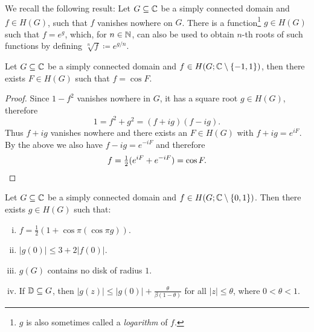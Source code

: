 We recall the following result: Let $G \subseteq \mathbb{C}$ be a simply connected domain and $f \in H(G)$, such that $f$ vanishes nowhere on $G$. There is a function\footnote{$g$ is also sometimes called a \emph{logarithm} of $f$.} $g \in H(G)$ such that $f = e^g$, which, for $n \in \mathbb{N}$, can also be used to obtain $n$-th roots of such functions by defining $\sqrt[n]{f} \coloneqq e^{g/n}$.

\begin{lemma} \label{lem:schottky-2}
    Let $G \subseteq \mathbb{C}$ be a simply connected domain and $f \in H(G; \mathbb{C} \setminus \{ -1, 1 \})$, then there exists $F \in H(G)$ such that $f = \cos F$.
\end{lemma}

\begin{proof}
    Since $1 - f^2$ vanishes nowhere in $G$, it has a square root $g \in H(G)$, therefore
    \begin{equation*}
        1 = f^2 + g^2 = (f + ig)(f - ig).
    \end{equation*}
    Thus $f + ig$ vanishes nowhere and there exists an $F \in H(G)$ with $f + ig = e^{iF}$. By the above we also have $f - ig = e^{-iF}$ and therefore
    \begin{equation*}
        f = {\textstyle \frac{1}{2}} (e^{iF} + e^{-iF}) = \cos F. \qedhere
    \end{equation*}
\end{proof}

\begin{lemma} \label{lem:schottky-3}
    Let $G \subseteq \mathbb{C}$ be a simply connected domain and $f \in H(G; \mathbb{C} \setminus \{ 0, 1 \})$. Then there exists $g \in H(G)$ such that:
    \begin{enumerate}[i.]
        \item $f = \frac{1}{2} ( 1 + \cos \pi (\cos \pi g))$.
        \item $\vert g(0) \vert \leq 3 + 2 \vert f(0) \vert$.
        \item $g(G)$ contains no disk of radius $1$.
        \item If $\mathbb{D} \subseteq G$, then $\vert g(z) \vert \leq \vert g(0) \vert + \frac{\theta}{\beta (1 - \theta)}$ for all $\vert z \vert \leq \theta$, where $0 < \theta < 1$.
    \end{enumerate}
\end{lemma}

